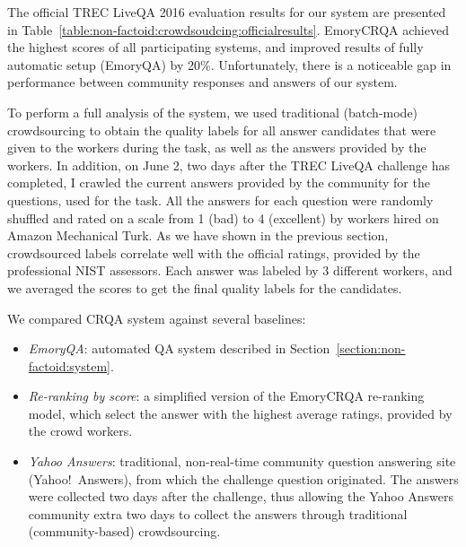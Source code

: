 The official TREC LiveQA 2016 evaluation results for our system are presented in Table~\ref{table:non-factoid:crowdsoudcing:officialresults}.
EmoryCRQA achieved the highest scores of all participating systems, and improved results of fully automatic setup (EmoryQA) by 20\%.
Unfortunately, there is a noticeable gap in performance between community responses and answers of our system.

To perform a full analysis of the system, we used traditional (batch-mode) crowdsourcing to obtain the quality labels for all answer candidates that were given to the workers during the task, as well as the answers provided by the workers.
In addition, on June 2, two days after the TREC LiveQA challenge has completed, I crawled the current answers provided by the community for the questions, used for the task.
All the answers for each question were randomly shuffled and rated on a scale from 1 (bad) to 4 (excellent) by workers hired on Amazon Mechanical Turk.
As we have shown in the previous section, crowdsourced labels correlate well with the official ratings, provided by the professional NIST assessors.
Each answer was labeled by 3 different workers, and we averaged the scores to get the final quality labels for the candidates.

We compared CRQA system against several baselines:
\begin{itemize}[noitemsep]
\item \textit{EmoryQA}: automated QA system described in Section~\ref{section:non-factoid:system}.
\item \textit{Re-ranking by score}: a simplified version of the EmoryCRQA re-ranking model, which select the answer with the highest average ratings, provided by the crowd workers.
\item \textit{Yahoo Answers}: traditional, non-real-time community question answering site (Yahoo!~Answers), from which the challenge question originated. The answers were collected two days after the challenge, thus allowing the Yahoo Answers community extra two days to collect the answers through traditional (community-based) crowdsourcing.
\end{itemize}

